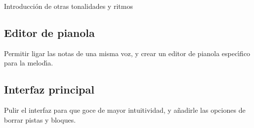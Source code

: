 \documentclass[a4paper,11pt]{article}
\begin{document}
Introducci\'on de otras tonalidades y ritmos

\subsection {Editor de pianola}

Permitir ligar las notas de una misma voz, y crear un editor de pianola espec\'\i fico para la melod\'\i a.

\subsection {Interfaz principal}

Pulir el interfaz para que goce de mayor intuitividad, y a\~nadirle las opciones de borrar pistas y bloques.
\end{document}
